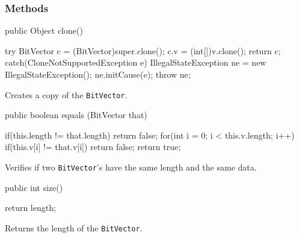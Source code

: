 \subsubsection* {Methods}
\begin{code}
   public Object clone() \begin{hide} {
      try{
         BitVector c = (BitVector)super.clone();
         c.v = (int[])v.clone();
         return c;
      }catch(CloneNotSupportedException e) {
         IllegalStateException ne = new IllegalStateException();
         ne.initCause(e);
         throw ne;
      }      
   } \end{hide}
\end{code}
\begin{tabb} Creates a copy of the \texttt{BitVector}.
\end{tabb}
\begin{htmlonly}
\end{htmlonly}
\begin{code}

   public boolean equals (BitVector that) \begin{hide} {
      if(this.length != that.length)
         return false;
      for(int i = 0; i < this.v.length; i++)
         if(this.v[i] != that.v[i])
            return false;
      return true;
   } \end{hide}
\end{code}
\begin{tabb} Verifies if two \texttt{BitVector}'s have the same length and
  the same data.
\end{tabb}
\begin{htmlonly}
\end{htmlonly}
\begin{code}

   public int size() \begin{hide} {
      return length;
   } \end{hide}
\end{code}
\begin{tabb} Returns the length of the \texttt{BitVector}.
\end{tabb}
\begin{htmlonly}
\end{htmlonly}
